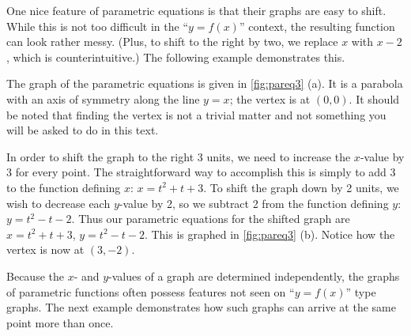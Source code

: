 One nice feature of parametric equations is that their graphs are easy to shift. While this is not too difficult in the ``$y=f(x)$'' context, the resulting function can look rather messy. (Plus, to shift to the right by two, we replace $x$ with $x-2$, which is counterintuitive.) The following example demonstrates this.


{The graph of the parametric equations is given in \autoref{fig:pareq3} (a). It is a parabola with an axis of symmetry along the line $y=x$; the vertex is at $(0,0)$. It should be noted that finding the vertex is not a trivial matter and not something you will be asked to do in this text.

In order to shift the graph to the right 3 units, we need to increase the $x$-value by 3 for every point. The straightforward way to accomplish this is simply to add 3 to the function defining $x$: $x = t^2+t+3$. To shift the graph down by 2 units, we wish to decrease each $y$-value by 2, so we subtract 2 from the function defining $y$: $y = t^2-t-2$. Thus our parametric equations for the shifted graph are $x=t^2+t+3$, $y=t^2-t-2$. This is graphed in \autoref{fig:pareq3} (b). Notice how the vertex is now at $(3,-2)$.}

Because the $x$- and $y$-values of a graph are determined independently, the graphs of parametric functions often possess features not seen on ``$y=f(x)$'' type graphs. The next example demonstrates how such graphs can arrive at the same point more than once.

